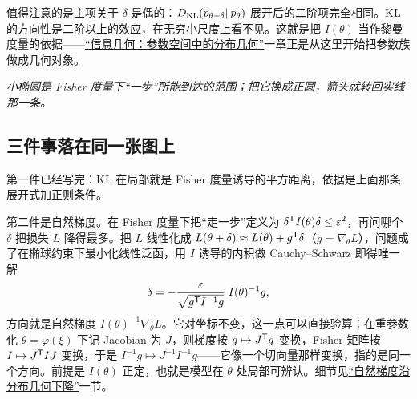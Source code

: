 值得注意的是主项关于 \(\delta\) 是偶的：\(D_{\mathrm{KL}}(p_{\theta+\delta}\|p_\theta)\) 展开后的二阶项完全相同。KL 的方向性是二阶以上的效应，在无穷小尺度上看不见。这就是把 \(I(\theta)\) 当作黎曼度量的依据——\hyperref[ch:105]{``信息几何：参数空间中的分布几何''}一章正是从这里开始把参数族做成几何对象。

\begin{center}
\end{center}

\emph{小椭圆是 Fisher 度量下``一步''所能到达的范围；把它换成正圆，箭头就转回实线那一条。}

\subsection{三件事落在同一张图上}

第一件已经写完：KL 在局部就是 Fisher 度量诱导的平方距离，依据是上面那条展开式加正则条件。

第二件是自然梯度。在 Fisher 度量下把``走一步''定义为 \(\delta^{\mathsf{T}}I(\theta)\delta\le\varepsilon^2\)，再问哪个 \(\delta\) 把损失 \(L\) 降得最多。把 \(L\) 线性化成 \(L(\theta+\delta)\approx L(\theta)+g^{\mathsf{T}}\delta\)（\(g=\nabla_\theta L\)），问题成了在椭球约束下最小化线性泛函，用 \(I\) 诱导的内积做 Cauchy--Schwarz 即得唯一解
\[
\delta=-\frac{\varepsilon}{\sqrt{g^{\mathsf{T}}I^{-1}g}}\;I(\theta)^{-1}g,
\]
方向就是自然梯度 \(I(\theta)^{-1}\nabla_\theta L\)。它对坐标不变，这一点可以直接验算：在重参数化 \(\theta=\varphi(\xi)\) 下记 Jacobian 为 \(J\)，则梯度按 \(g\mapsto J^{\mathsf{T}}g\) 变换，Fisher 矩阵按 \(I\mapsto J^{\mathsf{T}}IJ\) 变换，于是 \(I^{-1}g\mapsto J^{-1}I^{-1}g\)——它像一个切向量那样变换，指的是同一个方向。前提是 \(I(\theta)\) 正定，也就是模型在 \(\theta\) 处局部可辨认。细节见\hyperref[sec:12-Real-Analysis-Support/09-Information-Geometry/02]{``自然梯度沿分布几何下降''}一节。

